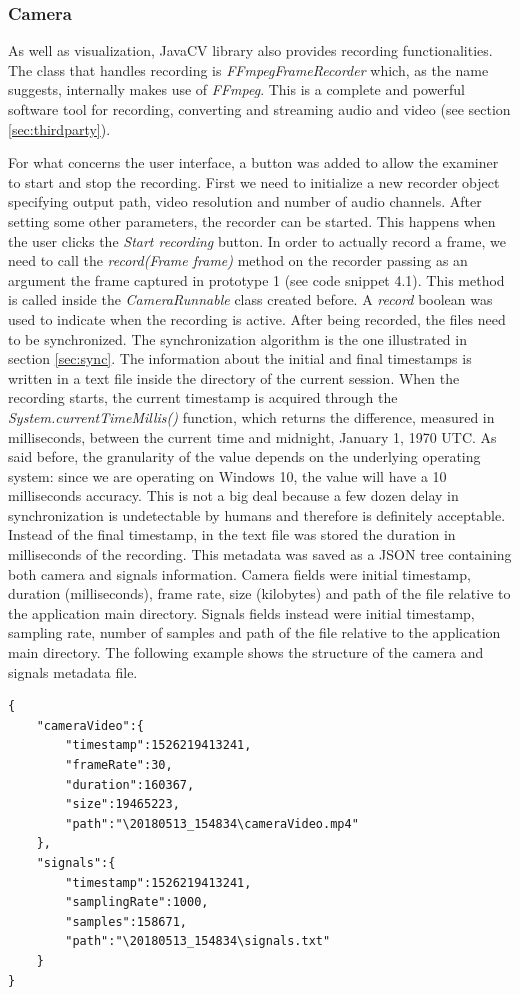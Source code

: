 \documentclass[binding=0.6cm,LaM]{sapthesis}
\begin{document}
\subsubsection{Camera}
As well as visualization, JavaCV library also provides recording functionalities. The class that handles recording is \textit{FFmpegFrameRecorder} which, as the name suggests, internally makes use of \textit{FFmpeg}. This is a complete and powerful software tool for recording, converting and streaming audio and video (see section \ref{sec:thirdparty}). 

For what concerns the user interface, a button was added to allow the examiner to start and stop the recording.
First we need to initialize a new recorder object specifying output path, video resolution and number of audio channels. After setting some other parameters, the recorder can be started. This happens when the user clicks the \textit{Start recording} button. In order to actually record a frame, we need to call the \textit{record(Frame frame)} method on the recorder passing as an argument the frame captured in prototype 1 (see code snippet 4.1). This method is called inside the \textit{CameraRunnable} class created before. A \textit{record} boolean was used to indicate when the recording is active.
After being recorded, the files need to be synchronized. The synchronization algorithm is the one illustrated in section \ref{sec:sync}. The information about the initial and final timestamps is written in a text file inside the directory of the current session. 
When the recording starts, the current timestamp is acquired through the \textit{System.currentTimeMillis()} function, which returns the difference, measured in milliseconds, between the current time and midnight, January 1, 1970 UTC. As said before, the granularity of the value depends on the underlying operating system: since we are operating on Windows 10, the value will have a 10 milliseconds accuracy. This is not a big deal because a few dozen delay in synchronization is undetectable by humans and therefore is definitely acceptable. Instead of the final timestamp, in the text file was stored the duration in milliseconds of the recording.
This metadata was saved as a JSON tree containing both camera and signals information. Camera fields were initial timestamp, duration (milliseconds), frame rate, size (kilobytes) and path of the file relative to the application main directory. Signals fields instead were initial timestamp, sampling rate, number of samples and path of the file relative to the application main directory. The following example shows the structure of the camera and signals metadata file.
\\
\begin{lstlisting}[caption={Recorded files metadata example}, captionpos=b]
{
	"cameraVideo":{
		"timestamp":1526219413241,
		"frameRate":30,
		"duration":160367,
		"size":19465223,
		"path":"\20180513_154834\cameraVideo.mp4"
	},
	"signals":{
		"timestamp":1526219413241,
		"samplingRate":1000,
		"samples":158671,
		"path":"\20180513_154834\signals.txt"
	}
}

\end{lstlisting}
\end{document}
